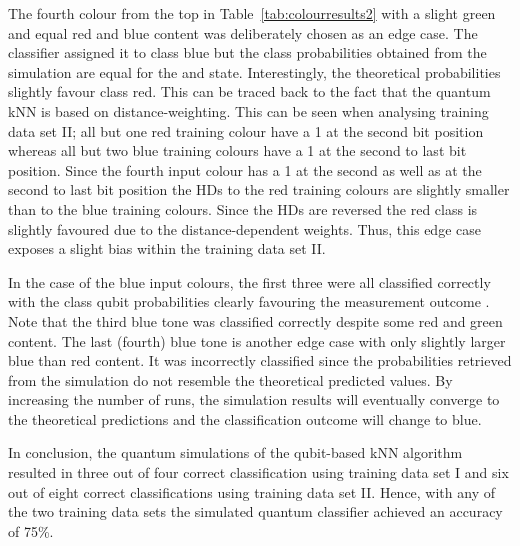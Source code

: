 The fourth colour from the top in Table~\ref{tab:colourresults2} with a slight green and equal red and blue content was deliberately chosen as an edge case. The classifier assigned it to class blue but the class probabilities obtained from the simulation are equal for the \0 and \1 state. Interestingly, the theoretical probabilities slightly favour class red. This can be traced back to the fact that the quantum kNN is based on distance-weighting. This can be seen when analysing training data set II; all but one red training colour have a 1 at the second bit position whereas all but two blue training colours have a 1 at the second to last bit position. Since the fourth input colour has a 1 at the second as well as at the second to last bit position the HDs to the red training colours are slightly smaller than to the blue training colours. Since the HDs are reversed the red class is slightly favoured due to the distance-dependent weights. Thus, this edge case exposes a slight bias within the training data set II.

In the case of the blue input colours, the first three were all classified correctly with the class qubit probabilities clearly favouring the measurement outcome \1. Note that the third blue tone was classified correctly despite some red and green content. The last (fourth) blue tone is another edge case with only slightly larger blue than red content. It was incorrectly classified since the probabilities retrieved from the simulation do not resemble the theoretical predicted values. By increasing the number of runs, the simulation results will eventually converge to the theoretical predictions and the classification outcome will change to blue.

In conclusion, the quantum simulations of the qubit-based kNN algorithm resulted in three out of four correct classification using training data set I and six out of eight correct classifications using training data set II. Hence, with any of the two training data sets the simulated quantum classifier achieved an accuracy of 75\%.


